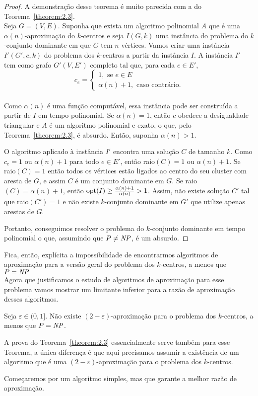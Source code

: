 \begin{proof}
        A demonstração desse teorema é muito parecida com a do Teorema~\ref{theorem:2.3}. \\
        Seja $G = (V,E)$. Suponha que exista um algoritmo polinomial $A$ que é uma $\alpha(n)$-aproximação do $k$-centros e seja $I(G,k)$ uma instância do problema do $k$-conjunto dominante em que $G$ tem $n$ vértices. Vamos criar uma instância $I'(G',c,k)$ do problema dos $k$-centros a partir da instância $I$. A instância $I'$ tem como grafo $G'(V,E')$ completo tal que, para cada $e \in E'$, \\
    \[c_e = \begin{cases}
            1, \text{ se } e \in E \\
            \alpha(n)+1, \text{ caso contrário.} 
            \end{cases}\]\\
    Como $\alpha(n)$ é uma função computável, essa instância pode ser construída a partir de $I$ em tempo polinomial.
    Se $\alpha(n)=1$, então $c$ obedece a desigualdade triangular e $A$ é um algoritmo polinomial e exato, o que, pelo Teorema~\ref{theorem:2.3}, é absurdo. Então, suponha $\alpha(n)>1$.

    O algoritmo aplicado à instância $I'$ encontra uma solução $C$ de tamanho $k$. Como $c_e = 1$ ou $\alpha(n)+1$ para todo $e \in E'$, então raio$(C)=1$ ou $\alpha(n)+1$.
    Se raio$(C)=1$ então todos os vértices estão ligados ao centro do seu cluster com aresta de $G$, e assim $C$ é um conjunto dominante em $G$.
    Se raio$(C) = \alpha(n) + 1$, então $\mathrm{opt}(I) \geq \frac{\alpha(n)+1}{\alpha(n)}>1$. Assim, não existe solução $C'$ tal que raio$(C')=1$ e não existe $k$-conjunto dominante em $G'$ que utilize apenas arestas de $G$.

    Portanto, conseguimos resolver o problema do $k$-conjunto dominante em tempo polinomial o que, assumindo que $P \neq \mathit{NP}$, é um absurdo.
\end{proof}
    Fica, então, explícita a impossibilidade de encontrarmos algoritmos de aproximação para a versão geral do problema dos $k$-centros, a menos que $P = \mathit{NP}$\\
    Agora que justificamos o estudo de algoritmos de aproximação para esse problema vamos mostrar um limitante inferior para a razão de aproximação desses algoritmos.
    
    \begin{theorem}
        Seja $\varepsilon \in (0,1]$. Não existe $(2-\varepsilon)$-aproximação para o problema dos $k$-centros, a menos que $P=\mathit{NP}$.
    \end{theorem}
    A prova do Teorema~\ref{theorem:2.3} essencialmente serve também para esse Teorema, a única diferença é que aqui precisamos assumir a existência de um algoritmo que é uma $(2 - \varepsilon)$-aproximação para o problema dos $k$-centros.

    Começaremos por um algoritmo simples, mas que garante a melhor razão de aproximação.